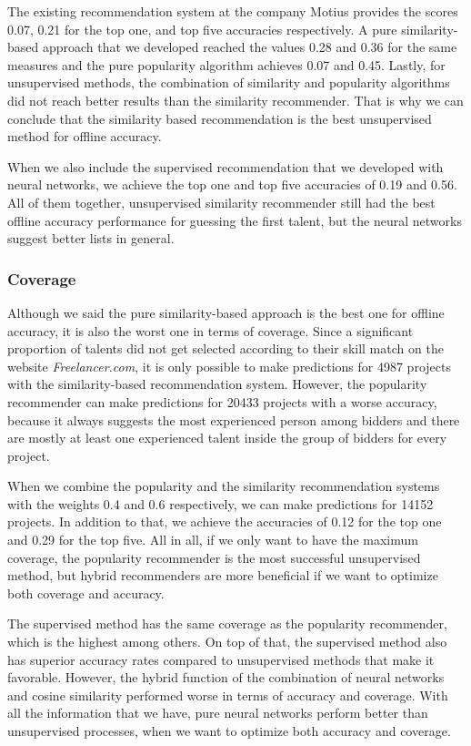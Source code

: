 The existing recommendation system at the company Motius provides the scores 0.07, 0.21 for the top one, and top five accuracies respectively. A pure similarity-based approach that we developed reached the values 0.28 and 0.36 for the same measures and the pure popularity algorithm achieves 0.07 and 0.45. Lastly, for unsupervised methods, the combination of similarity and popularity algorithms did not reach better results than the similarity recommender. That is why we can conclude that the similarity based recommendation is the best unsupervised method for offline accuracy.

When we also include the supervised recommendation that we developed with neural networks, we achieve the top one and top five accuracies of 0.19 and 0.56. All of them together, unsupervised similarity recommender still had the best offline accuracy performance for guessing the first talent, but the neural networks suggest better lists in general.

\subsubsection{Coverage}

Although we said the pure similarity-based approach is the best one for offline accuracy, it is also the worst one in terms of coverage. Since a significant proportion of talents did not get selected according to their skill match on the website \textit{Freelancer.com}, it is only possible to make predictions for 4987 projects with the similarity-based recommendation system. However, the popularity recommender can make predictions for 20433 projects with a worse accuracy, because it always suggests the most experienced person among bidders and there are mostly at least one experienced talent inside the group of bidders for every project.

When we combine the popularity and the similarity recommendation systems with the weights 0.4 and 0.6 respectively, we can make predictions for 14152 projects. In addition to that,  we achieve the accuracies of 0.12 for the top one and 0.29 for the top five. All in all, if we only want to have the maximum coverage, the popularity recommender is the most successful unsupervised method, but hybrid recommenders are more beneficial if we want to optimize both coverage and accuracy.

The supervised method has the same coverage as the popularity recommender, which is the highest among others. On top of that, the supervised method also has superior accuracy rates compared to unsupervised methods that make it favorable. However, the hybrid function of the combination of neural networks and cosine similarity performed worse in terms of accuracy and coverage. With all the information that we have, pure neural networks perform better than unsupervised processes, when we want to optimize both accuracy and coverage.

